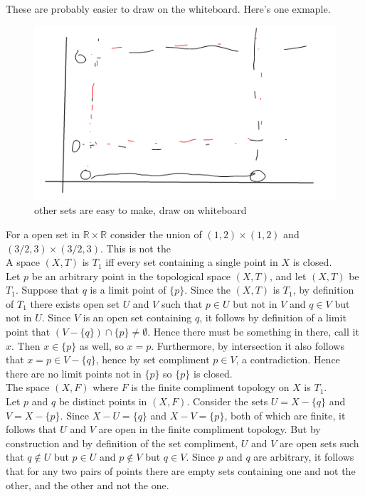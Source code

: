 \documentclass{article}
\newcommand{\R}{\mathbb{R}}
\begin{document}
These are probably easier to draw on the whiteboard. Here's one exmaple. 

\begin{figure}[htbp]
\centerline{\includegraphics[scale=0.5]{notebook/open_basic.png}}
\caption{other sets are easy to make, draw on whiteboard}
\label{fig}
\end{figure}

For a open set in $\R\times \R$ consider the union of $(1,2)\times(1,2)$ and $(3/2,3)\times (3/2,3)$. This is not the 
\\


 A space $(X,T)$ is $T_1$ iff every set containing a single point in $X$ is closed. \\

 Let $p$ be an arbitrary point in the topological space $(X,T)$, and let $(X,T)$ be $T_1$. Suppose that $q$ is a limit point of $\{p\}$. Since the $(X,T)$ is $T_1$, by definition of $T_1$ there exists open set $U$ and $V$ such that $p\in U$ but not in $V$ and $q\in V$ but not in $U$. Since $V$ is an open set containing $q$, it follows by definition of a limit point that $(V-\{q\})\cap \{p\} \ne \emptyset$. Hence there must be something in there, call it $x$. Then $x\in \{p\}$ as well, so $x = p$. Furthermore, by intersection it also follows that $x = p\in V-\{q\}$, hence by set compliment $p\in V$, a contradiction. Hence there are no limit points not in $\{p\}$ so $\{p\}$ is closed.\\


 The space $(X,F)$ where $F$ is the finite compliment topology on $X$ is $T_1$.\\

 Let $p$ and $q$ be distinct points in $(X,F)$. Consider the sets $ U = X-\{q\}$ and $V = X-\{p\}$. Since $X - U = \{q\}$ and $X - V = \{p\}$, both of which are finite, it follows that $U$ and $V$ are open in the finite compliment topology. But by construction and by definition of the set compliment, $U$ and $V$ are open sets such that $q\not\in U$ but $p\in U$ and $p\not\in V$ but $q\in V$. Since $p$ and $q$ are arbitrary, it follows that for any two pairs of points there are empty sets containing one and not the other, and the other and not the one.\\
\end{document}
